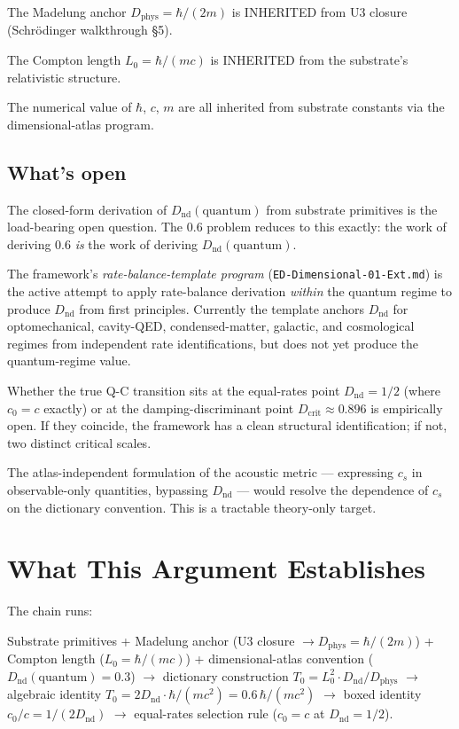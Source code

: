\documentclass[11pt,a4paper]{article}
\begin{document}
The Madelung anchor $D_\mathrm{phys} = \hbar/(2m)$ is INHERITED from U3 closure (Schr\"odinger walkthrough \S5).

The Compton length $L_0 = \hbar/(mc)$ is INHERITED from the substrate's relativistic structure.

The numerical value of $\hbar$, $c$, $m$ are all inherited from substrate constants via the dimensional-atlas program.

\subsection{What's open}

The closed-form derivation of $D_\mathrm{nd}(\mathrm{quantum})$ from substrate primitives is the load-bearing open question. The 0.6 problem reduces to this exactly: the work of deriving 0.6 \emph{is} the work of deriving $D_\mathrm{nd}(\mathrm{quantum})$.

The framework's \emph{rate-balance-template program} (\texttt{ED-Dimensional-01-Ext.md}) is the active attempt to apply rate-balance derivation \emph{within} the quantum regime to produce $D_\mathrm{nd}$ from first principles. Currently the template anchors $D_\mathrm{nd}$ for optomechanical, cavity-QED, condensed-matter, galactic, and cosmological regimes from independent rate identifications, but does not yet produce the quantum-regime value.

Whether the true Q-C transition sits at the equal-rates point $D_\mathrm{nd} = 1/2$ (where $c_0 = c$ exactly) or at the damping-discriminant point $D_\mathrm{crit} \approx 0.896$ is empirically open. If they coincide, the framework has a clean structural identification; if not, two distinct critical scales.

The atlas-independent formulation of the acoustic metric --- expressing $c_s$ in observable-only quantities, bypassing $D_\mathrm{nd}$ --- would resolve the dependence of $c_s$ on the dictionary convention. This is a tractable theory-only target.

\section{What This Argument Establishes}

The chain runs:

Substrate primitives + Madelung anchor (U3 closure $\to D_\mathrm{phys} = \hbar/(2m)$) + Compton length ($L_0 = \hbar/(mc)$) + dimensional-atlas convention ($D_\mathrm{nd}(\mathrm{quantum}) = 0.3$) $\to$ dictionary construction $T_0 = L_0^{2} \cdot D_\mathrm{nd}/D_\mathrm{phys}$ $\to$ algebraic identity $T_0 = 2 D_\mathrm{nd} \cdot \hbar/(mc^{2}) = 0.6\,\hbar/(mc^{2})$ $\to$ boxed identity $c_0/c = 1/(2 D_\mathrm{nd})$ $\to$ equal-rates selection rule ($c_0 = c$ at $D_\mathrm{nd} = 1/2$).
\end{document}
